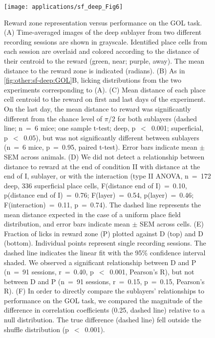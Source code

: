 \begin{figure}
	\centering
	\texttt{[image: applications/sf\_deep\_Fig6]}
	\caption[Reward zone representation versus performance on the GOL task]{Reward zone representation versus performance on the GOL task.
	(A) Time-averaged images of the deep sublayer from two different recording sessions are shown in grayscale. Identified place cells from each session are overlaid and colored according to the distance of their centroid to the reward (green, near; purple, away). The mean distance to the reward zone is indicated (radians).
	(B) As in \autoref{fig:other:sf-deep:GOL}B, licking distributions from the two experiments corresponding to (A).
	(C) Mean distance of each place cell centroid to the reward on first and last days of the experiment. On the last day, the mean distance to reward was significantly different from the chance level of $\pi$/2 for both sublayers (dashed line; n~=~6 mice; one sample t-test; deep, p~$<$~0.001; superficial, p~$<$~0.05), but was not significantly different between sublayers (n~=~6 mice, p~=~0.95, paired t-test). Error bars indicate mean $\pm$ SEM across animals.
	(D) We did not detect a relationship between distance to reward at the end of condition II with distance at the end of I, sublayer, or with the interaction (type II ANOVA, n~=~172 deep, 336 superficial place cells, F(distance end of I)~=~0.10, p(distance end of I)~=~0.76; F(layer)~=~0.54, p(layer)~=~0.46; F(interaction)~=~0.11, p~=~0.74). The dashed line represents the mean distance expected in the case of a uniform place field distribution, and error bars indicate mean $\pm$ SEM across cells.
	(E) Fraction of licks in reward zone (P) plotted against D (top) and D (bottom). Individual points represent single recording sessions. The dashed line indicates the linear fit with the 95\% confidence interval shaded. We observed a significant relationship between D and P (n~=~91 sessions, r~=~0.40, p~$<$~0.001, Pearson's R), but not between D and P (n~=~91 sessions, r~=~0.15, p~=~0.15, Pearson's R).
	(F) In order to directly compare the sublayers' relationships to performance on the GOL task, we compared the magnitude of the difference in correlation coefficients (0.25, dashed line) relative to a null distribution. The true difference (dashed line) fell outside the shuffle distribution (p~$<$~0.001).
	}
	\label{fig:other:sf-deep:enrichment}
\end{figure}